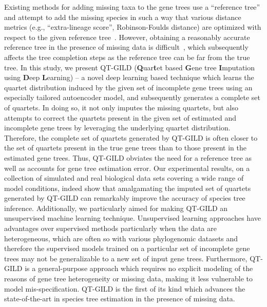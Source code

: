 \documentclass[10pt,a4paper]{article}
\newcommand{\add}[1]{{\color{blue} #1}}
\begin{document}
Existing methods for adding missing taxa to the gene trees use a ``reference tree'' and attempt to add the missing species in such a way that various distance metrics (e.g., ``extra-lineage score'', Robinson-Foulds distance) are optimized with respect to the given reference tree~\cite{bayzid-incomplete,octal}. However, obtaining a reasonably accurate reference tree in the presence of missing data is difficult~\cite{octal}, which subsequently affects the tree completion steps as the reference tree can be far from the true tree. In this study, we present QT-GILD (\textbf{Q}uar\textbf{t}et based \textbf{G}ene tree \textbf{I}mputation using \textbf{D}eep \textbf{L}earning) -- a novel deep learning based technique which learns the quartet distribution induced by the given set of incomplete gene trees using an especially tailored autoencoder model, and subsequently generates a complete set of quartets. In doing so, it not only imputes the missing quartets, but also attempts \add{to correct} the quartets present in the given set of estimated and incomplete gene trees by leveraging the underlying quartet distribution. Therefore, the complete set of quartets generated by QT-GILD is often closer to the set of quartets present in the true gene trees than to those present in the estimated gene trees. Thus, QT-GILD obviates the need for a reference tree as well as accounts for gene tree estimation error. Our experimental results, on a collection of simulated and real biological data sets covering a wide range of model conditions, indeed show that amalgamating the imputed set of quartets generated by QT-GILD can remarkably improve the accuracy of species tree inference. Additionally, we particularly aimed for making QT-GILD an unsupervised machine learning technique. Unsupervised learning approaches have advantages over supervised methods particularly when the data are heterogeneous, which are often so with various phylogenomic \add{datasets} and therefore the supervised models trained on a particular set of incomplete gene trees may not be generalizable to a new set of input gene trees. Furthermore, QT-GILD is a general-purpose approach which  requires no explicit modeling of the reasons of gene tree heterogeneity or missing data, making it less vulnerable to model mis-specification.
QT-GILD is the first of its kind which advances the state-of-the-art in species tree estimation in the presence of missing data. 
\end{document}
